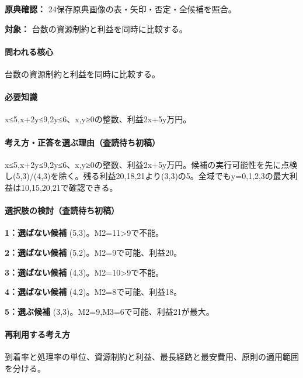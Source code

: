 \noindent\textbf{原典確認：} 24保存原典画像の表・矢印・否定・全候補を照合。\par

\noindent\textbf{対象：} 台数の資源制約と利益を同時に比較する。\par

\paragraph{問われる核心} 台数の資源制約と利益を同時に比較する。

\paragraph{必要知識} x≤5,x+2y≤9,2y≤6、x,y≥0の整数、利益2x+5y万円。

\paragraph{考え方・正答を選ぶ理由（査読待ち初稿）} x≤5,x+2y≤9,2y≤6、x,y≥0の整数、利益2x+5y万円。候補の実行可能性を先に点検し(5,3)/(4,3)を除く。残る利益20,18,21より(3,3)の5。全域でもy=\allowbreak{}0,1,2,3の最大利益は10,15,20,21で確認できる。

\paragraph{選択肢の検討（査読待ち初稿）}\mbox{}\par

\noindent\textbf{1：選ばない候補} (5,3)。M2=\allowbreak{}11>9で不能。\par

\noindent\textbf{2：選ばない候補} (5,2)。M2=\allowbreak{}9で可能、利益20。\par

\noindent\textbf{3：選ばない候補} (4,3)。M2=\allowbreak{}10>9で不能。\par

\noindent\textbf{4：選ばない候補} (4,2)。M2=\allowbreak{}8で可能、利益18。\par

\noindent\textbf{5：選ぶ候補} (3,3)。M2=\allowbreak{}9,M3=\allowbreak{}6で可能、利益21が最大。\par

\paragraph{再利用する考え方} 到着率と処理率の単位、資源制約と利益、最長経路と最安費用、原則の適用範囲を分ける。

